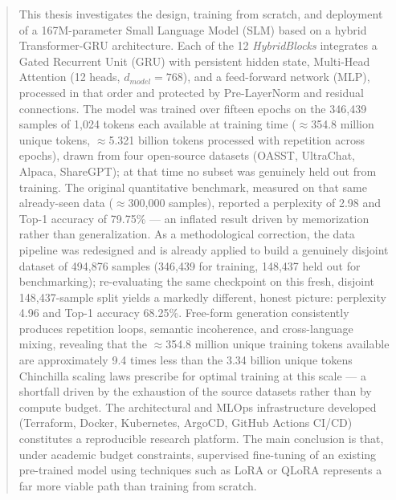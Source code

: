 \cleardoublepage
\vspace*{\fill}
\begin{abstract}
    This thesis investigates the design, training from scratch, and deployment of a 167M-parameter Small Language Model (SLM) based on a hybrid Transformer-GRU architecture. Each of the 12 \textit{HybridBlocks} integrates a Gated Recurrent Unit (GRU) with persistent hidden state, Multi-Head Attention (12 heads, $d_{model}=768$), and a feed-forward network (MLP), processed in that order and protected by Pre-LayerNorm and residual connections. The model was trained over fifteen epochs on the 346,439 samples of 1,024 tokens each available at training time ($\approx$354.8 million unique tokens, $\approx$5.321 billion tokens processed with repetition across epochs), drawn from four open-source datasets (OASST, UltraChat, Alpaca, ShareGPT); at that time no subset was genuinely held out from training. The original quantitative benchmark, measured on that same already-seen data ($\approx$300,000 samples), reported a perplexity of 2.98 and Top-1 accuracy of 79.75\% --- an inflated result driven by memorization rather than generalization. As a methodological correction, the data pipeline was redesigned and is already applied to build a genuinely disjoint dataset of 494,876 samples (346,439 for training, 148,437 held out for benchmarking); re-evaluating the same checkpoint on this fresh, disjoint 148,437-sample split yields a markedly different, honest picture: perplexity 4.96 and Top-1 accuracy 68.25\%. Free-form generation consistently produces repetition loops, semantic incoherence, and cross-language mixing, revealing that the $\approx$354.8 million unique training tokens available are approximately 9.4 times less than the 3.34 billion unique tokens Chinchilla scaling laws prescribe for optimal training at this scale --- a shortfall driven by the exhaustion of the source datasets rather than by compute budget. The architectural and MLOps infrastructure developed (Terraform, Docker, Kubernetes, ArgoCD, GitHub Actions CI/CD) constitutes a reproducible research platform. The main conclusion is that, under academic budget constraints, supervised fine-tuning of an existing pre-trained model using techniques such as LoRA or QLoRA represents a far more viable path than training from scratch.
\end{abstract}
\vspace*{\fill}
\clearpage

